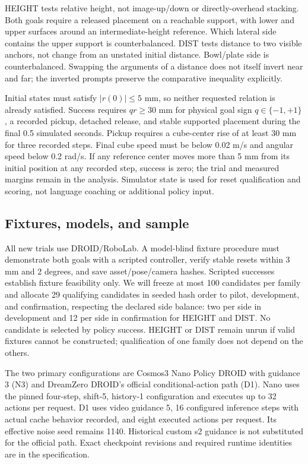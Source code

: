 \documentclass[11pt]{article}
\begin{document}
HEIGHT tests relative height, not image-up/down or directly-overhead stacking. Both goals require a released placement on a reachable support, with lower and upper surfaces around an intermediate-height reference. Which lateral side contains the upper support is counterbalanced. DIST tests distance to two visible anchors, not change from an unstated initial distance. Bowl/plate side is counterbalanced. Swapping the arguments of a distance does not itself invert near and far; the inverted prompts preserve the comparative inequality explicitly.

Initial states must satisfy $|r(0)|\leq5$ mm, so neither requested relation is already satisfied. Success requires $q r\geq30$ mm for physical goal sign $q\in\{-1,+1\}$, a recorded pickup, detached release, and stable supported placement during the final 0.5 simulated seconds. Pickup requires a cube-center rise of at least 30 mm for three recorded steps. Final cube speed must be below 0.02 m/s and angular speed below 0.2 rad/s. If any reference center moves more than 5 mm from its initial position at any recorded step, success is zero; the trial and measured margins remain in the analysis. Simulator state is used for reset qualification and scoring, not language coaching or additional policy input.

\subsection{Fixtures, models, and sample}
All new trials use DROID/RoboLab. A model-blind fixture procedure must demonstrate both goals with a scripted controller, verify stable resets within 3 mm and 2 degrees, and save asset/pose/camera hashes. Scripted successes establish fixture feasibility only. We will freeze at most 100 candidates per family and allocate 29 qualifying candidates in seeded hash order to pilot, development, and confirmation, respecting the declared side balance: two per side in development and 12 per side in confirmation for HEIGHT and DIST. No candidate is selected by policy success. HEIGHT or DIST remain unrun if valid fixtures cannot be constructed; qualification of one family does not depend on the others.

The two primary configurations are Cosmos3 Nano Policy DROID with guidance 3 (N3) and DreamZero DROID's official conditional-action path (D1). Nano uses the pinned four-step, shift-5, history-1 configuration and executes up to 32 actions per request. D1 uses video guidance 5, 16 configured inference steps with actual cache behavior recorded, and eight executed actions per request. Its effective noise seed remains 1140. Historical custom s2 guidance is not substituted for the official path. Exact checkpoint revisions and required runtime identities are in the specification.
\end{document}
